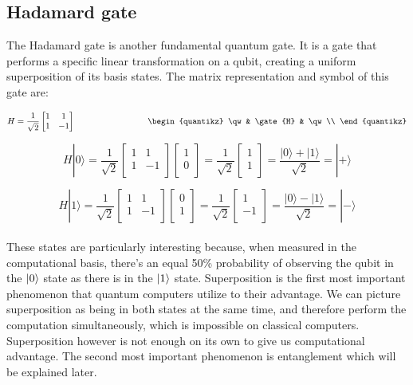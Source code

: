 \documentclass[12pt,a4paper]{report}
\begin{document}
\subsection{Hadamard gate}

\noindent
The Hadamard gate is another fundamental quantum gate. It is a gate that performs a specific linear transformation on a qubit, creating a uniform superposition of its basis states. The matrix representation and symbol of this gate are:

\[ H = \frac{1}{\sqrt{2}} \begin{bmatrix}
1 & 1 \\
1 & -1 \\
\end{bmatrix} 
\hspace{3cm}
\begin{quantikz}
\qw & \gate{H} & \qw \\
\end{quantikz}
\]

\[
H |0\rangle = \frac{1}{\sqrt{2}} \begin{bmatrix}
1 & 1 \\
1 & -1 \\
\end{bmatrix} \begin{bmatrix}
1 \\
0 \\
\end{bmatrix} = \frac{1}{\sqrt{2}} \begin{bmatrix}
1 \\
1 \\
\end{bmatrix} = \frac{|0\rangle + |1\rangle}{\sqrt{2}} = |+\rangle
\]

\[
H |1\rangle = \frac{1}{\sqrt{2}} \begin{bmatrix}
1 & 1 \\
1 & -1 \\
\end{bmatrix} \begin{bmatrix}
0 \\
1 \\
\end{bmatrix} = \frac{1}{\sqrt{2}} \begin{bmatrix}
1 \\
-1 \\
\end{bmatrix} = \frac{|0\rangle - |1\rangle}{\sqrt{2}} = |-\rangle
\]
\\

\noindent
These states are particularly interesting because, when measured in the computational basis, there's an equal 50\% probability of observing the qubit in the \( \ket{0} \) state as there is in the \( \ket{1} \) state. Superposition is the first most important phenomenon that quantum computers utilize to their advantage. We can picture superposition as being in both states at the same time, and therefore perform the computation simultaneously, which is impossible on classical computers. Superposition however is not enough on its own to give us computational advantage. The second most important phenomenon is entanglement which will be explained later.
\end{document}
